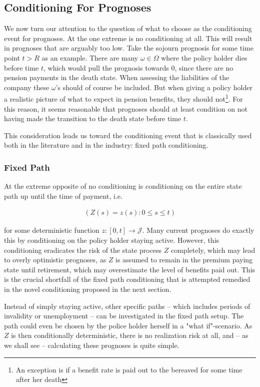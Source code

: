 \documentclass{article}
\newcommand{\1}[1]{\mathbbm{1}_{\left\lbrace #1 \right\rbrace}}
\theoremstyle{break}
\theoremstyle{remark}
\numberwithin{equation}{section}
\begin{document}
\subsection{Conditioning For Prognoses} \label{CondForProg}

We now turn our attention to the question of what to choose as the conditioning event for prognoses. At the one extreme is no conditioning at all. This will result in prognoses that are arguably too low. Take the sojourn prognosis for some time point $t>R$ as an example. There are many $\omega \in \Omega$ where the policy holder dies before time $t$, which would pull the prognosis towards 0, since there are no pension payments in the death state. When assessing the liabilities of the company these $\omega$'s should of course be included. But when giving a policy holder a realistic picture of what to expect in pension benefits, they should not\footnote{An exception is if a benefit rate is paid out to the bereaved for some time after her death}. For this reason, it seems reasonable that prognoses should at least condition on not having made the transition to the death state before time $t$.

This consideration leads us toward the conditioning event that is classically used both in the literature and in the industry: fixed path conditioning.

\subsubsection{Fixed Path}

At the extreme opposite of no conditioning is conditioning on the entire state path up until the time of payment, i.e.

\begin{align} \label{FixedPathz}
\left( Z(s) = z(s) : 0 \leq s \leq t \right)
\end{align}

for some deterministic function $z: [0,t] \to \mathcal{J}$. Many current prognoses do exactly this by conditioning on the policy holder staying active. However, this conditioning eradicates the risk of the state process $Z$ completely, which may lead to overly optimistic prognoses, as $Z$ is assumed to remain in the premium paying state until retirement, which may overestimate the level of benefits paid out. This is the crucial shortfall of the fixed path conditioning that is attempted remedied in the novel conditioning proposed in the next section.

Instead of simply staying active, other specific paths -- which includes periods of invalidity or unemployment -- can be investigated in the fixed path setup. The path could even be chosen by the police holder herself in a "what if"-scenario. As $Z$ is then conditionally deterministic, there is no realization risk at all, and -- as we shall see -- calculating these prognoses is quite simple.
\end{document}
